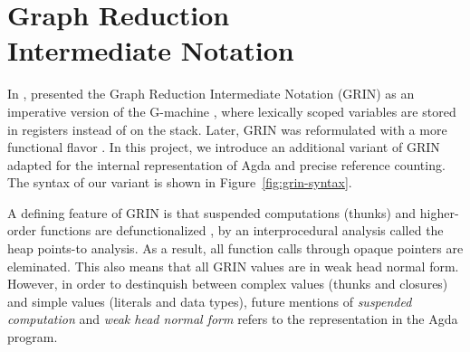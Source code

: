 \documentclass[10pt, twocolumn]{article}
\begin{document}
\section{Graph Reduction \\ Intermediate Notation}
In \citeyear{johnsson1991}, \citeauthor{johnsson1991} presented the Graph Reduction Intermediate Notation (GRIN) as an imperative version of the G-machine \citep{johnsson1984}, where lexically scoped variables are stored in registers instead of on the stack. 
Later, GRIN was reformulated with a more functional flavor \citep{boquist1995}.
In this project, we introduce an additional variant of GRIN adapted for the internal representation of Agda and precise reference counting. 
The syntax of our variant is shown in \mbox{Figure \ref{fig:grin-syntax}}.

A defining feature of GRIN is that suspended computations (thunks) and higher-order functions are defunctionalized \citep{reynolds1972}, by 
an interprocedural analysis called the heap points-to analysis.
As a result, all function calls through opaque pointers are eleminated. 
This also means that all GRIN values are in weak head normal form. 
However, in order to destinquish between complex values (thunks and closures) and simple values (literals and data types), 
future mentions of \emph{suspended computation} and \emph{weak head normal form} refers to the representation in the Agda program.
\end{document}
